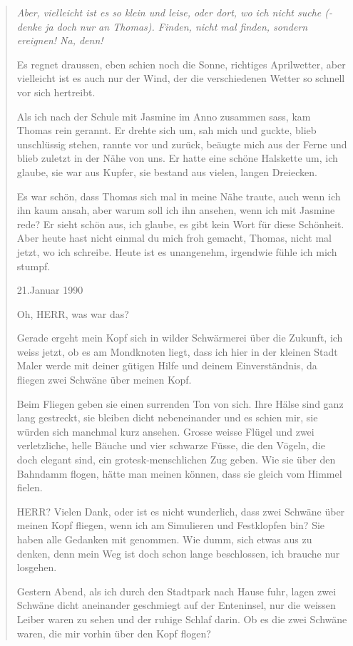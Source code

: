 \documentclass[10pt,a5paper]{book}
\newenvironment{tg}{\begin{quote}\em}{\end{quote}}
\begin{document}
\begin{tg}
Aber, vielleicht ist es so klein und leise, oder dort, wo ich nicht suche (- denke ja doch nur an Thomas). Finden, nicht mal finden, sondern ereignen! Na, denn!

Es regnet draussen, eben schien noch die Sonne, richtiges Aprilwetter, aber vielleicht ist es auch nur der Wind, der die verschiedenen Wetter so schnell vor sich hertreibt.

Als ich nach der Schule mit Jasmine im Anno zusammen sass, kam Thomas rein gerannt. Er drehte sich um, sah mich und guckte, blieb unschlüssig stehen, rannte vor und zurück, beäugte mich aus der Ferne und blieb zuletzt in der Nähe von uns. Er hatte eine schöne Halskette um, ich glaube, sie war aus Kupfer, sie bestand aus vielen, langen Dreiecken.

Es war schön, dass Thomas sich mal in meine Nähe traute, auch wenn ich ihn kaum ansah, aber warum soll ich ihn ansehen, wenn ich mit Jasmine rede? Er sieht schön aus, ich glaube, es gibt kein Wort für diese Schönheit.
Aber heute hast nicht einmal du mich froh gemacht, Thomas, nicht mal jetzt, wo ich schreibe. Heute ist es unangenehm, irgendwie fühle ich mich stumpf.

21.Januar 1990

Oh, HERR, was war das?

Gerade ergeht mein Kopf sich in wilder Schwärmerei über die Zukunft, ich weiss jetzt, ob es am Mondknoten liegt, dass ich hier in der kleinen Stadt Maler werde mit deiner gütigen Hilfe und deinem Einverständnis, da fliegen zwei Schwäne über meinen Kopf.

Beim Fliegen geben sie einen surrenden Ton von sich. Ihre Hälse sind ganz lang gestreckt, sie bleiben dicht nebeneinander und es schien mir, sie würden sich manchmal kurz ansehen. Grosse weisse Flügel und zwei verletzliche, helle Bäuche und vier schwarze Füsse, die den Vögeln, die doch elegant sind, ein grotesk-menschlichen Zug geben. Wie sie über den Bahndamm flogen, hätte man meinen können, dass sie gleich vom Himmel fielen.

HERR? Vielen Dank, oder ist es nicht wunderlich, dass zwei Schwäne über meinen Kopf fliegen, wenn ich am Simulieren und Festklopfen bin? Sie haben alle Gedanken mit genommen. Wie dumm, sich etwas aus zu denken, denn mein Weg ist doch schon lange beschlossen, ich brauche nur losgehen.

Gestern Abend, als ich durch den Stadtpark nach Hause fuhr, lagen zwei Schwäne dicht aneinander geschmiegt auf der Enteninsel, nur die weissen Leiber waren zu sehen und der ruhige Schlaf darin. Ob es die zwei Schwäne waren, die mir vorhin über den Kopf flogen?


\end{tg}
\end{document}
